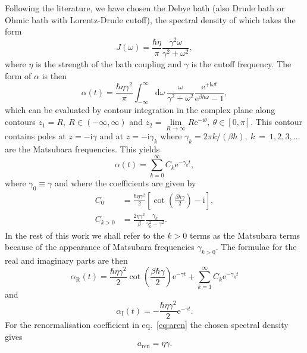 Following the literature\supercite{Caldeira1983a,Caldeira1983b,Grabert1984a,Tanimura1989}, we have chosen the Debye bath (also Drude bath or Ohmic bath with Lorentz-Drude cutoff), the spectral density of which takes the form
\begin{equation}
	J(\omega) = \frac{\hbar\eta}{\pi}\frac{\gamma^2\omega}{\gamma^2 + \omega^2},
\end{equation}
where $\eta$ is the strength of the bath coupling and $\gamma$ is the cutoff frequency.
\clearpage
\noindent The form of $\alpha$ is then
\begin{equation}
	\alpha(t) = \frac{\hbar\eta\gamma^2}{\pi}\int_{-\infty}^{\infty}\mathrm{d}\omega\ 
	\frac{\omega}{\gamma^2 + \omega^2} \frac{\mathrm{e}^{+\mathrm{i}\omega t}}{\mathrm{e}^{\beta\hbar\omega}-1},
\end{equation}
which can be evaluated by contour integration in the complex plane along contours $z_1 = R,\ R \in (-\infty, \infty)$ and $z_2= \lim\limits_{R\to \infty} R \mathrm{e}^{-\mathrm{i}\theta},\ \theta \in [0,\pi]$. This contour contains poles at $z = -\mathrm{i}\gamma$ and at $z= -\mathrm{i}\gamma_k$ where $\gamma_k = 2\pi k/(\beta\hbar),\ k~=~1,2,3,\dots$ are the Matsubara frequencies. This yields
\begin{equation}
\alpha(t) = \sum_{k=0}^{\infty} C_k \mathrm{e}^{-\gamma_k t},
\label{eq:alpha_series}
\end{equation}
where $\gamma_0 \equiv \gamma$ and where the coefficients are given by
\begin{equation}
\begin{split}
	C_0 &= \frac{\hbar\eta\gamma^2}{2}\left[\cot\left(\frac{\beta\hbar\gamma}{2}\right) -\mathrm{i}\right],\\
	C_{k>0} &= \frac{2\eta\gamma^2}{\beta}\frac{\gamma_k}{\gamma_k^2-\gamma^2}.
\end{split}
\end{equation}
In the rest of this work we shall refer to the $k>0$ terms as the Matsubara terms because of the appearance of Matsubara frequencies $\gamma_{k>0}$. The  formulae for the real and imaginary parts are then
\begin{equation}
\alpha_\mathrm{R}(t) = \frac{\hbar\eta\gamma^2}{2}\cot\left(\frac{\beta\hbar\gamma}{2}\right)\mathrm{e}^{-\gamma t} + \sum_{k=1}^{\infty} C_k \mathrm{e}^{-\gamma_k t}
\end{equation}
and
\begin{equation}
\alpha_\mathrm{I}(t) = - \frac{\hbar\eta\gamma^2}{2}\mathrm{e}^{-\gamma t}.
\end{equation}
For the renormalisation coefficient in eq.~\ref{eq:aren} the chosen spectral density gives
\begin{equation}
	a_\mathrm{ren} = \eta\gamma.
\end{equation}
\newpage

